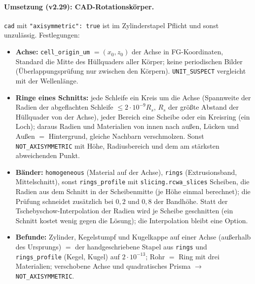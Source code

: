 \paragraph{Umsetzung (v2.29): CAD-Rotationskörper.}
\verb|cad| mit \verb|"axisymmetric": true| ist im Zylinderstapel Pflicht und sonst unzulässig. Festlegungen:
\begin{itemize}[nosep]
  \item \textbf{Achse:} \verb|cell_origin_um| $=(x_0,z_0)$ der Achse in FG-Koordinaten, Standard die Mitte des
        Hüllquaders aller Körper; keine periodischen Bilder (Überlappungsprüfung nur zwischen den Körpern).
        \verb|UNIT_SUSPECT| vergleicht mit der Wellenlänge.
  \item \textbf{Ringe eines Schnitts:} jede Schleife ein Kreis um die Achse (Spannweite der Radien der abgeflachten
        Schleife $\le2\cdot10^{-9}R_s$, $R_s$ der größte Abstand der Hüllquader von der Achse), jeder Bereich eine
        Scheibe oder ein Kreisring (ein Loch); daraus Radien und Materialien von innen nach außen, Lücken und Außen
        $=$ Hintergrund, gleiche Nachbarn verschmolzen. Sonst \verb|NOT_AXISYMMETRIC| mit Höhe, Radiusbereich und dem
        am stärksten abweichenden Punkt.
  \item \textbf{Bänder:} \verb|homogeneous| (Material auf der Achse), \verb|rings| (Extrusionsband, Mittelschnitt),
        sonst \verb|rings_profile| mit \verb|slicing.rcwa_slices| Scheiben, die Radien aus dem Schnitt in der
        Scheibenmitte (je Höhe einmal berechnet); die Prüfung schneidet zusätzlich bei $0{,}2$ und $0{,}8$ der Bandhöhe.
        Statt der Tschebyschow-Interpolation der Radien wird je Scheibe geschnitten (ein Schnitt kostet wenig gegen die
        Lösung); die Interpolation bleibt eine Option.
  \item \textbf{Befunde:} Zylinder, Kegelstumpf und Kugelkappe auf einer Achse (außerhalb des Ursprungs) $=$ der
        handgeschriebene Stapel aus \verb|rings| und \verb|rings_profile| (Kegel, Kugel) auf $2\cdot10^{-13}$; Rohr $=$ Ring
        mit drei Materialien; verschobene Achse und quadratisches Prisma $\to$ \verb|NOT_AXISYMMETRIC|.
\end{itemize}

